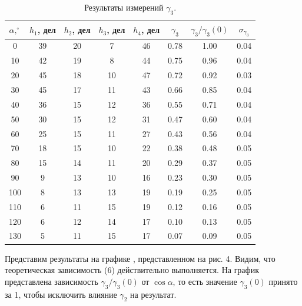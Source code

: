 \documentclass[a4paper,12pt]{article}
\begin{document}
\begin{table}[H]
\begin{tabular}{|c|c|c|c|c|c|c|c|} \hline
$\alpha, ^\circ$ & $h_1$, дел & $h_2$, дел & $h_3$, дел & $h_4$, дел & $\gamma_3$ & $\gamma_3 / \gamma_3(0)$ & $\sigma_{\gamma_3}$ \\ \hline
0 & 39 & 20 & 7 & 46 & 0.78 & 1.00 & 0.04 \\ \hline
10 & 42 & 19 & 8 & 44 & 0.75 & 0.96 & 0.04 \\ \hline
20 & 45 & 18 & 10 & 47 & 0.72 & 0.92 & 0.03 \\ \hline
30 & 45 & 17 & 11 & 43 & 0.66 & 0.85 & 0.04 \\ \hline
40 & 36 & 15 & 12 & 36 & 0.55 & 0.71 & 0.04 \\ \hline
50 & 30 & 15 & 12 & 31 & 0.47 & 0.60 & 0.04 \\ \hline
60 & 25 & 15 & 11 & 27 & 0.43 & 0.56 & 0.04 \\ \hline
70 & 18 & 15 & 10 & 22 & 0.38 & 0.48 & 0.05 \\ \hline
80 & 15 & 14 & 11 & 20 & 0.29 & 0.37 & 0.05 \\ \hline
90 & 9 & 13 & 10 & 16 & 0.23 & 0.30 & 0.05 \\ \hline
100 & 8 & 13 & 13 & 19 & 0.19 & 0.25 & 0.05 \\ \hline
110 & 6 & 11 & 15 & 19 & 0.12 & 0.16 & 0.05 \\ \hline
120 & 6 & 12 & 14 & 17 & 0.10 & 0.13 & 0.05 \\ \hline
130 & 5 & 11 & 15 & 17 & 0.07 & 0.09 & 0.05 \\ \hline
\end{tabular}
\centering
\caption{Результаты измерений $\gamma_3$.}
\end{table} 

\noindent Представим результаты на графике , представленном на рис. 4. Видим, что теоретическая зависимость (6) действительно выполняется. На график представлена зависимость $\gamma_3 / \gamma_3(0)$ от $\cos \alpha$, то есть значение $\gamma_3(0)$ принято за 1, чтобы исключить влияние $\gamma_2$ на результат.
\end{document}
